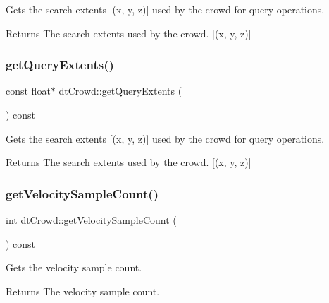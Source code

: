 Gets the search extents \mbox{[}(x, y, z)\mbox{]} used by the crowd for query operations. \begin{DoxyReturn}{Returns}
The search extents used by the crowd. \mbox{[}(x, y, z)\mbox{]} 
\end{DoxyReturn}
\mbox{\label{classdtCrowd_a6a37c9f57844d91e46fd4c8ef9de17b0}} 
\subsubsection{\texorpdfstring{get\+Query\+Extents()}{getQueryExtents()}\hspace{0.1cm}{\footnotesize\ttfamily [2/2]}}
{\footnotesize\ttfamily const float$\ast$ dt\+Crowd\+::get\+Query\+Extents (\begin{DoxyParamCaption}{ }\end{DoxyParamCaption}) const\hspace{0.3cm}{\ttfamily [inline]}}

Gets the search extents \mbox{[}(x, y, z)\mbox{]} used by the crowd for query operations. \begin{DoxyReturn}{Returns}
The search extents used by the crowd. \mbox{[}(x, y, z)\mbox{]} 
\end{DoxyReturn}
\mbox{\label{classdtCrowd_a22ceec36962e3fdaccfbe4e84a8b24b3}} 
\subsubsection{\texorpdfstring{get\+Velocity\+Sample\+Count()}{getVelocitySampleCount()}\hspace{0.1cm}{\footnotesize\ttfamily [1/2]}}
{\footnotesize\ttfamily int dt\+Crowd\+::get\+Velocity\+Sample\+Count (\begin{DoxyParamCaption}{ }\end{DoxyParamCaption}) const\hspace{0.3cm}{\ttfamily [inline]}}

Gets the velocity sample count. \begin{DoxyReturn}{Returns}
The velocity sample count. 
\end{DoxyReturn}
\mbox{\label{classdtCrowd_a22ceec36962e3fdaccfbe4e84a8b24b3}} 
